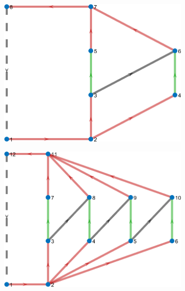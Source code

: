 \documentclass{article}
\begin{document}
\begin{figure}[htbp]
    \centering
    \begin{subfigure}[b]{0.45\textwidth}
        \includegraphics[width=\textwidth]{../attachments/f-dege-mac-2.png}
        \caption{}
        \label{fig:d-size-2}
    \end{subfigure}
    \hspace{0.05\textwidth}
    \begin{subfigure}[b]{0.45\textwidth}
        \includegraphics[width=\textwidth]{../attachments/f-dege-mac-4.png}
        \caption{}
        \label{fig:d-size-4}
    \end{subfigure}
    \hspace{0.05\textwidth}

\end{figure}
\end{document}
